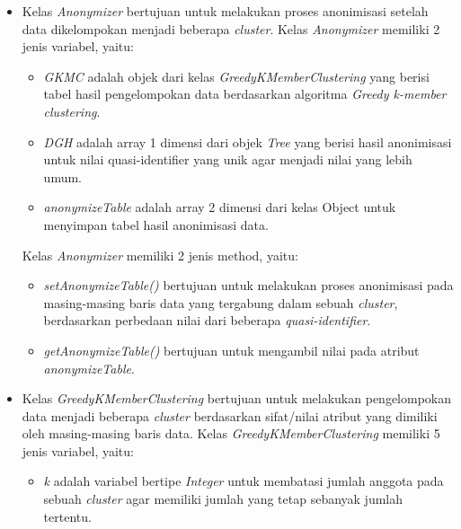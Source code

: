 \begin{itemize}
\item Kelas \textit{Anonymizer} bertujuan untuk melakukan proses anonimisasi setelah data dikelompokan menjadi beberapa \textit{cluster}. Kelas \textit{Anonymizer} memiliki 2 jenis variabel, yaitu:

\begin{itemize}

\item \textit{GKMC} adalah objek dari kelas \textit{GreedyKMemberClustering} yang berisi tabel hasil pengelompokan data berdasarkan algoritma \textit{Greedy k-member clustering}.

\item \textit{DGH} adalah array 1 dimensi dari objek \textit{Tree} yang berisi hasil anonimisasi untuk nilai quasi-identifier yang unik agar menjadi nilai yang lebih umum.

\item \textit{anonymizeTable} adalah array 2 dimensi dari kelas Object untuk menyimpan tabel hasil anonimisasi data.

\end{itemize}

\noindent Kelas \textit{Anonymizer} memiliki 2 jenis method, yaitu:

\begin{itemize}

\item \textit{setAnonymizeTable()} bertujuan untuk melakukan proses anonimisasi pada masing-masing baris data yang tergabung dalam sebuah \textit{cluster}, berdasarkan perbedaan nilai dari beberapa \textit{quasi-identifier}.

\item \textit{getAnonymizeTable()} bertujuan untuk mengambil nilai pada atribut \textit{anonymizeTable}.

\end{itemize}


\item Kelas \textit{GreedyKMemberClustering} bertujuan untuk melakukan pengelompokan data menjadi beberapa \textit{cluster} berdasarkan sifat/nilai atribut yang dimiliki oleh masing-masing baris data. Kelas \textit{GreedyKMemberClustering} memiliki 5 jenis variabel, yaitu:

\begin{itemize}

\item \textit{k} adalah variabel bertipe \textit{Integer} untuk membatasi jumlah anggota pada sebuah \textit{cluster} agar memiliki jumlah yang tetap sebanyak jumlah tertentu.


\end{itemize}
\end{itemize}
